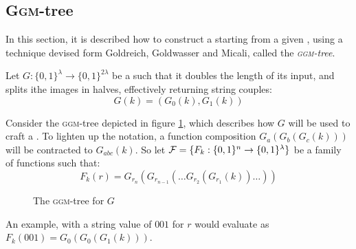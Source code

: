 \pagebreak

\subsection{\textsc{Ggm}-tree}

In this section, it is described how to construct a \prf{} starting from a given \prg, using a technique devised form Goldreich, Goldwasser and Micali, called the \emph{\textsc{ggm}-tree}.

\begin{construction}
    Let $G : \{0, 1\}^{\lambda} \to \{0, 1\}^{2\lambda} $ be a \prg{} such that it doubles the length of its input, and splits ithe images in halves, effectively returning string couples: 
    \[
        G(k)=(G_{0}(k), G_{1}(k))
    \]

    Consider the \textsc{ggm}-tree depicted in figure \ref{fig:ggmtree}, which describes how $G$ will be used to craft a \prf. To lighten up the notation, a function composition $G_a(G_b(G_c(k)))$ will be contracted to $G_{abc}(k)$. So let $\mathcal{F}=\{F_{k} : \{0, 1\}^n \to \{0, 1\}^\lambda\}$ be a family of functions such that:
    \[
        F_k(r)=G_{r_{n}}(G_{r_{n-1}}( \dots G_{r_2}(G_{r_1}(k)) \dots ))
    \]

    \begin{figure}[htbp]
        \centering
        \caption{The \textsc{ggm}-tree for $G$}
        \label{fig:ggmtree}
    \end{figure}

\end{construction}

An example, with a string value of $001$ for $r$ would evaluate as $F_k(001) = G_0(G_0(G_1(k)))$.

